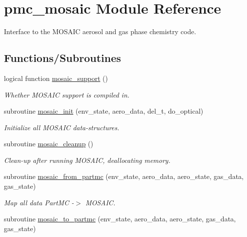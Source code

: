 \hypertarget{namespacepmc__mosaic}{}\section{pmc\+\_\+mosaic Module Reference}
\label{namespacepmc__mosaic}


Interface to the M\+O\+S\+A\+IC aerosol and gas phase chemistry code.  


\subsection*{Functions/\+Subroutines}
\begin{DoxyCompactItemize}
\item 
logical function \mbox{\hyperlink{namespacepmc__mosaic_a22592fd57cef945bbb2ef2e49bc0f05c}{mosaic\+\_\+support}} ()
\begin{DoxyCompactList}\small\item\em Whether M\+O\+S\+A\+IC support is compiled in. \end{DoxyCompactList}\item 
subroutine \mbox{\hyperlink{namespacepmc__mosaic_a1cdd76ef5164c35b7fe46b4fe3c2b044}{mosaic\+\_\+init}} (env\+\_\+state, aero\+\_\+data, del\+\_\+t, do\+\_\+optical)
\begin{DoxyCompactList}\small\item\em Initialize all M\+O\+S\+A\+IC data-\/structures. \end{DoxyCompactList}\item 
subroutine \mbox{\hyperlink{namespacepmc__mosaic_a0165a7096d2674446d32c4ad0193eca0}{mosaic\+\_\+cleanup}} ()
\begin{DoxyCompactList}\small\item\em Clean-\/up after running M\+O\+S\+A\+IC, deallocating memory. \end{DoxyCompactList}\item 
subroutine \mbox{\hyperlink{namespacepmc__mosaic_a2f4a894b5b6a349f83df026675a64940}{mosaic\+\_\+from\+\_\+partmc}} (env\+\_\+state, aero\+\_\+data, aero\+\_\+state, gas\+\_\+data, gas\+\_\+state)
\begin{DoxyCompactList}\small\item\em Map all data Part\+MC -\/$>$ M\+O\+S\+A\+IC. \end{DoxyCompactList}\item 
subroutine \mbox{\hyperlink{namespacepmc__mosaic_aa1b93b04307f0290a3ccf15d4453c473}{mosaic\+\_\+to\+\_\+partmc}} (env\+\_\+state, aero\+\_\+data, aero\+\_\+state, gas\+\_\+data, gas\+\_\+state)

\end{DoxyCompactItemize}
